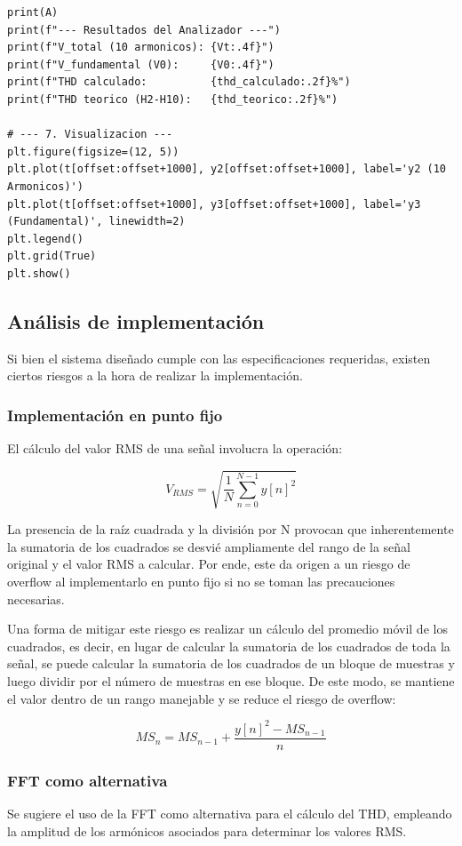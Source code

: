 \begin{lstlisting}[style=mystyle, caption={Código empleado en la implementación.}, label={lst:filtro + ds}]
print(A)
print(f"--- Resultados del Analizador ---")
print(f"V_total (10 armonicos): {Vt:.4f}")
print(f"V_fundamental (V0):     {V0:.4f}")
print(f"THD calculado:          {thd_calculado:.2f}%")
print(f"THD teorico (H2-H10):   {thd_teorico:.2f}%")

# --- 7. Visualizacion ---
plt.figure(figsize=(12, 5))
plt.plot(t[offset:offset+1000], y2[offset:offset+1000], label='y2 (10 Armonicos)')
plt.plot(t[offset:offset+1000], y3[offset:offset+1000], label='y3 (Fundamental)', linewidth=2)
plt.legend()
plt.grid(True)
plt.show()
\end{lstlisting}

\subsection{Análisis de implementación}
Si bien el sistema diseñado cumple con las especificaciones requeridas, existen ciertos riesgos a la hora de realizar la implementación.
\subsubsection{Implementación en punto fijo}
El cálculo del valor RMS de una señal involucra la operación:

\begin{equation}
V_{RMS} = \sqrt{\frac{1}{N} \sum_{n=0}^{N-1} y[n]^2}
\end{equation}

\noindent La presencia de la raíz cuadrada y la división por N provocan que inherentemente la sumatoria de los cuadrados se desvié ampliamente del rango de la señal original y el valor RMS a calcular. Por ende, este da origen a un riesgo de overflow al implementarlo en punto fijo si no se toman las precauciones necesarias. 

Una forma de mitigar este riesgo es realizar un cálculo del promedio móvil de los cuadrados, es decir, en lugar de calcular la sumatoria de los cuadrados de toda la señal, se puede calcular la sumatoria de los cuadrados de un bloque de muestras y luego dividir por el número de muestras en ese bloque. De este modo, se mantiene el valor dentro de un rango manejable y se reduce el riesgo de overflow:

\begin{equation}
MS_{n} = MS_{n-1} + \frac{y[n]^2 - MS_{n-1}}{n}
\end{equation}

\subsubsection{FFT como alternativa}
Se sugiere el uso de la FFT como alternativa para el cálculo del THD, empleando la amplitud de los armónicos asociados para determinar los valores RMS.

